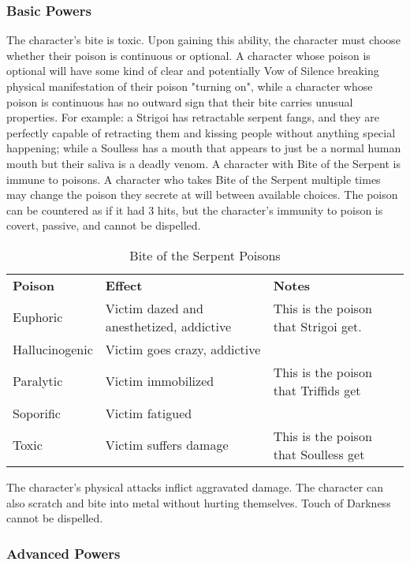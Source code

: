 \subsubsection{Basic Powers}

 The character's bite is toxic. Upon gaining this ability, the character must choose whether their poison is continuous or optional. A character whose poison is optional will have some kind of clear and potentially Vow of Silence breaking physical manifestation of their poison "turning on", while a character whose poison is continuous has no outward sign that their bite carries unusual properties. For example: a Strigoi has retractable serpent fangs, and they are perfectly capable of retracting them and kissing people without anything special happening; while a Soulless has a mouth that appears to just be a normal human mouth but their saliva is a deadly venom. A character with Bite of the Serpent is immune to poisons. A character who takes Bite of the Serpent multiple times may change the poison they secrete at will between available choices. The poison can be countered as if it had 3 hits, but the character's immunity to poison is covert, passive, and cannot be dispelled.


\begin{table}[htb]
 \caption{Bite of the Serpent Poisons} \centering
\begin{tabular}{l l l}
\textbf{Poison}& \textbf{Effect} & \textbf{Notes}\\
 Euphoric & Victim dazed and anesthetized, addictive & This is the poison that Strigoi get.\\
 Hallucinogenic & Victim goes crazy, addictive&\\
 Paralytic & Victim immobilized & This is the poison that Triffids get\\
 Soporific & Victim fatigued & \\
 Toxic & Victim suffers damage & This is the poison that Soulless get\\
\end{tabular}
\end{table}

 The character's physical attacks inflict aggravated damage. The character can also scratch and bite into metal without hurting themselves. Touch of Darkness cannot be dispelled.

\subsubsection{Advanced Powers}

